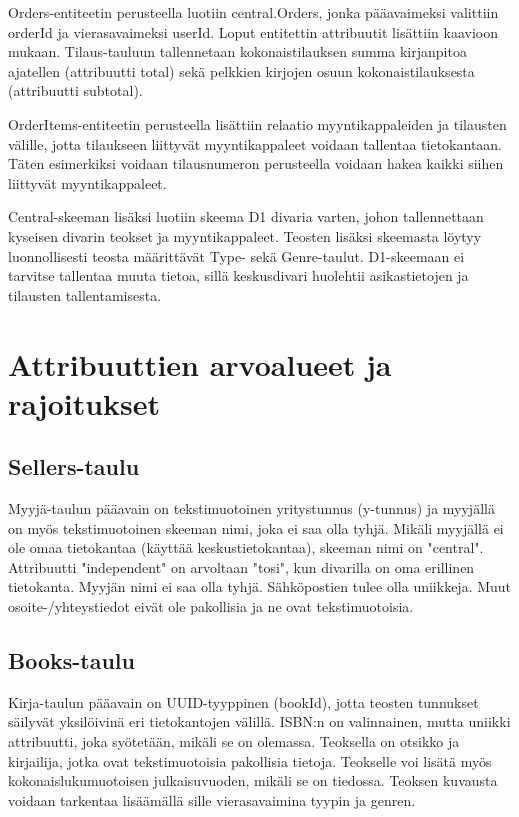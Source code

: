 \documentclass[11pt,a4paper]{article}
\begin{document}
Orders-entiteetin perusteella luotiin central.Orders, jonka pääavaimeksi valittiin orderId ja vierasavaimeksi userId. Loput entitettin attribuutit lisättiin kaavioon mukaan. Tilaus-tauluun tallennetaan kokonaistilauksen summa kirjanpitoa ajatellen (attribuutti total) sekä pelkkien kirjojen osuun kokonaistilauksesta (attribuutti subtotal).

OrderItems-entiteetin perusteella lisättiin relaatio myyntikappaleiden ja tilausten välille, jotta tilaukseen liittyvät myyntikappaleet voidaan tallentaa tietokantaan. Täten esimerkiksi voidaan tilausnumeron perusteella voidaan hakea kaikki siihen liittyvät myyntikappaleet.

Central-skeeman lisäksi luotiin skeema D1 divaria varten, johon tallennettaan kyseisen divarin teokset ja myyntikappaleet. Teosten lisäksi skeemasta löytyy luonnollisesti teosta määrittävät Type- sekä Genre-taulut. D1-skeemaan ei tarvitse tallentaa muuta tietoa, sillä keskusdivari huolehtii asikastietojen ja tilausten tallentamisesta.

\section{Attribuuttien arvoalueet ja rajoitukset}

\subsection{Sellers-taulu}

Myyjä-taulun pääavain on tekstimuotoinen yritystunnus (y-tunnus) ja myyjällä on myös tekstimuotoinen skeeman nimi, joka ei saa olla tyhjä. Mikäli myyjällä ei ole omaa tietokantaa (käyttää keskustietokantaa), skeeman nimi on "central". Attribuutti "independent" on arvoltaan "tosi", kun divarilla on oma erillinen tietokanta. Myyjän nimi ei saa olla tyhjä. Sähköpostien tulee olla uniikkeja. Muut osoite-/yhteystiedot eivät ole pakollisia ja ne ovat tekstimuotoisia.

\subsection{Books-taulu}

Kirja-taulun pääavain on UUID-tyyppinen (bookId), jotta teosten tunnukset säilyvät yksilöivinä eri tietokantojen välillä. ISBN:n on valinnainen, mutta uniikki attribuutti, joka syötetään, mikäli se on olemassa. Teoksella on otsikko ja kirjailija, jotka ovat tekstimuotoisia pakollisia tietoja. Teokselle voi lisätä myös kokonaislukumuotoisen julkaisuvuoden, mikäli se on tiedossa. Teoksen kuvausta voidaan tarkentaa lisäämällä sille vierasavaimina tyypin ja genren.
\end{document}
